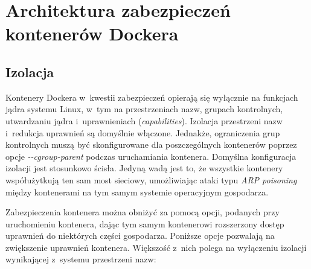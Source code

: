 \chapter{Architektura zabezpieczeń kontenerów Dockera}

\section{Izolacja}

Kontenery Dockera w~kwestii zabezpieczeń opierają się wyłącznie na funkcjach jądra systemu Linux, w~tym na przestrzeniach nazw, grupach kontrolnych, utwardzaniu jądra i~uprawnieniach (\textit{capabilities}). Izolacja przestrzeni nazw i~redukcja uprawnień są domyślnie włączone. Jednakże, ograniczenia grup kontrolnych muszą być skonfigurowane dla poszczególnych kontenerów poprzez opcje \textit{-{}-cgroup-parent} podczas uruchamiania kontenera. Domyślna konfiguracja izolacji jest stosunkowo ścisła. Jedyną wadą jest to, że wszystkie kontenery współużytkują ten sam most sieciowy, umożliwiając ataki typu \textit{ARP poisoning} między kontenerami na tym samym systemie operacyjnym gospodarza.

Zabezpieczenia kontenera można obniżyć za pomocą opcji, podanych przy uruchomieniu kontenera, dając tym samym kontenerowi rozszerzony dostęp uprawnień do niektórych części gospodarza. Poniższe opcje pozwalają na zwiększenie uprawnień kontenera. Większość z~nich polega na wyłączeniu izolacji wynikającej z~systemu przestrzeni nazw:


